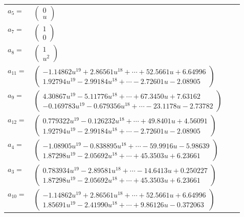 \documentclass[1p]{elsarticle_modified}
\theoremstyle{definition}
\begin{document}
\begin{tabular}{m{7pt} m{180pt} m{7pt} m{180pt} }
\flushright $a_{5}=$&$\begin{pmatrix}0\\u\end{pmatrix}$ \\
\flushright $a_{7}=$&$\begin{pmatrix}1\\0\end{pmatrix}$ \\
\flushright $a_{8}=$&$\begin{pmatrix}1\\u^2\end{pmatrix}$ \\
\flushright $a_{11}=$&$\begin{pmatrix}-1.14862 u^{19}+2.86561 u^{18}+\cdots+52.5661 u+6.64996\\1.92794 u^{19}-2.99184 u^{18}+\cdots-2.72601 u-2.08905\end{pmatrix}$ \\
\flushright $a_{9}=$&$\begin{pmatrix}4.30867 u^{19}-5.11776 u^{18}+\cdots+67.3450 u+7.63162\\-0.169783 u^{19}-0.679356 u^{18}+\cdots-23.1178 u-2.73782\end{pmatrix}$ \\
\flushright $a_{12}=$&$\begin{pmatrix}0.779322 u^{19}-0.126232 u^{18}+\cdots+49.8401 u+4.56091\\1.92794 u^{19}-2.99184 u^{18}+\cdots-2.72601 u-2.08905\end{pmatrix}$ \\
\flushright $a_{4}=$&$\begin{pmatrix}-1.08905 u^{19}-0.838895 u^{18}+\cdots-59.9916 u-5.98639\\1.87298 u^{19}-2.05692 u^{18}+\cdots+45.3503 u+6.23661\end{pmatrix}$ \\
\flushright $a_{3}=$&$\begin{pmatrix}0.783934 u^{19}-2.89581 u^{18}+\cdots-14.6413 u+0.250227\\1.87298 u^{19}-2.05692 u^{18}+\cdots+45.3503 u+6.23661\end{pmatrix}$ \\
\flushright $a_{10}=$&$\begin{pmatrix}-1.14862 u^{19}+2.86561 u^{18}+\cdots+52.5661 u+6.64996\\1.85691 u^{19}-2.41990 u^{18}+\cdots+9.86126 u-0.372063\end{pmatrix}$ \\

\end{tabular}
\end{document}
